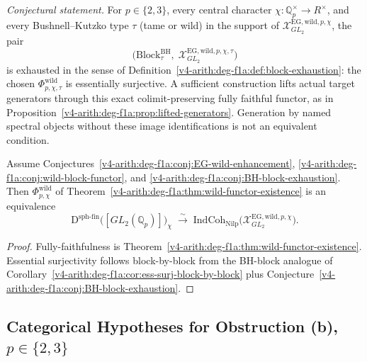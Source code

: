 \begin{conjecture}
\label{v4-arith:deg-f1a:conj:BH-block-exhaustion}
\emph{Conjectural statement.} For \(p\in\{2,3\}\), every central character
\(\chi:\mathbb Q_p^\times\to R^\times\), and every
Bushnell--Kutzko type \(\tau\) (tame or wild) in the support of
\(\mathcal{X}^{\mathrm{EG,wild},p,\chi}_{GL_{2}}\), the pair
\[
\bigl(\mathrm{Block}^{\mathrm{BH}}_{\tau},\;\mathcal{X}^{\mathrm{EG,wild},p,\chi,\tau}_{GL_{2}}\bigr)
\]
is exhausted in the sense of
Definition~\ref{v4-arith:deg-f1a:def:block-exhaustion}: the chosen
\(\Phi^{\mathrm{wild}}_{p,\chi,\tau}\) is essentially surjective.
A sufficient construction lifts actual target generators through
this exact colimit-preserving fully faithful functor, as in
Proposition~\ref{v4-arith:deg-f1a:prop:lifted-generators}.
Generation by named spectral objects without these image
identifications is not an equivalent condition.
\end{conjecture}

\begin{corollary}
\label{v4-arith:deg-f1a:cor:wild-ess-surj}
Assume Conjectures~\ref{v4-arith:deg-f1a:conj:EG-wild-enhancement},
\ref{v4-arith:deg-f1a:conj:wild-block-functor}, and
\ref{v4-arith:deg-f1a:conj:BH-block-exhaustion}.
Then
\(\Phi^{\mathrm{wild}}_{p,\chi}\) of
Theorem~\ref{v4-arith:deg-f1a:thm:wild-functor-existence} is an equivalence
\begin{equation}
\mathrm{D}^{\mathrm{sph\text{-}fin}}\bigl([GL_{2}(\mathbb{Q}_{p})]\bigr)_{\chi}
\;\xrightarrow{\;\sim\;}\;\mathrm{IndCoh}_{\mathrm{Nilp}}\bigl(\mathcal{X}^{\mathrm{EG,wild},p,\chi}_{GL_{2}}\bigr).
\end{equation}
\end{corollary}

\begin{proof}
Fully-faithfulness is Theorem~\ref{v4-arith:deg-f1a:thm:wild-functor-existence}.
Essential surjectivity follows block-by-block from the BH-block
analogue of Corollary~\ref{v4-arith:deg-f1a:cor:ess-surj-block-by-block}
plus Conjecture~\ref{v4-arith:deg-f1a:conj:BH-block-exhaustion}.
\end{proof}

\subsection{Categorical Hypotheses for Obstruction (b), \texorpdfstring{\(p\in\{2,3\}\)}{p in {2,3}}}

